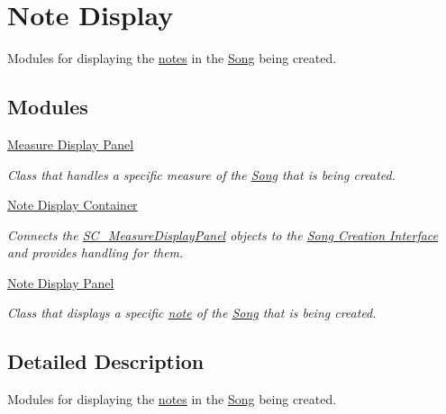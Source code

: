 \hypertarget{group___doc_s_c___n_d}{}\section{Note Display}
\label{group___doc_s_c___n_d}


Modules for displaying the \hyperlink{group___music_structs_struct_music_1_1_combined_note}{notes} in the \hyperlink{class_song}{Song} being created.  


\subsection*{Modules}
\begin{DoxyCompactItemize}
\item 
\hyperlink{group___doc_s_c___m_d_p}{Measure Display Panel}
\begin{DoxyCompactList}\small\item\em Class that handles a specific measure of the \hyperlink{class_song}{Song} that is being created. \end{DoxyCompactList}\item 
\hyperlink{group___doc_s_c___n_d_c}{Note Display Container}
\begin{DoxyCompactList}\small\item\em Connects the \hyperlink{class_s_c___measure_display_panel}{S\+C\+\_\+\+Measure\+Display\+Panel} objects to the \hyperlink{group___doc_s_c}{Song Creation Interface} and provides handling for them. \end{DoxyCompactList}\item 
\hyperlink{group___doc_s_c___n_d_p}{Note Display Panel}
\begin{DoxyCompactList}\small\item\em Class that displays a specific \hyperlink{group___music_structs_struct_music_1_1_combined_note}{note} of the \hyperlink{class_song}{Song} that is being created. \end{DoxyCompactList}\end{DoxyCompactItemize}


\subsection{Detailed Description}
Modules for displaying the \hyperlink{group___music_structs_struct_music_1_1_combined_note}{notes} in the \hyperlink{class_song}{Song} being created. 

